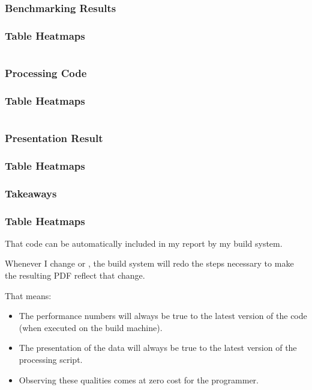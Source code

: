 {\subsubsection{Benchmarking Results}
\begin{frame}[fragile]
  \frametitle{Table Heatmaps }
  \vspace{-1mm}
  \inputminted[fontsize=\footnotesize]{text}{../src/table_heatmap/code.txt}
\end{frame}

\subsubsection{Processing Code}
\begin{frame}[fragile]
  \frametitle{Table Heatmaps }
  \vspace{-5mm}
  \begin{multicols}{2}
    \inputminted[fontsize=\tiny,breaklines]{python}{../src/table_heatmap/process.py}
  \end{multicols}
\end{frame}

\subsubsection{Presentation Result}
\begin{frame}[fragile]
  \frametitle{Table Heatmaps }
  \vspace{24mm}
  \scalebox{0.9}{
    
  }
\end{frame}

\subsubsection{Takeaways}
\begin{frame}[fragile]
  \frametitle{Table Heatmaps }
  \pause
  \vspace{3mm}
  That code can be automatically included in my report by my build system.
  
  \vspace{5mm}
  Whenever I change  or , the build system will redo the steps necessary to make the resulting PDF reflect that change.
  
  \pause
  \vspace{5mm}
  That means:
  \begin{itemize}
    \item The performance numbers will always be true to the latest version of the code (when executed on the build machine).
    \item The presentation of the data will always be true to the latest version of the processing script.
    \item Observing these qualities comes at zero cost for the programmer.
  \end{itemize}
\end{frame}

}
